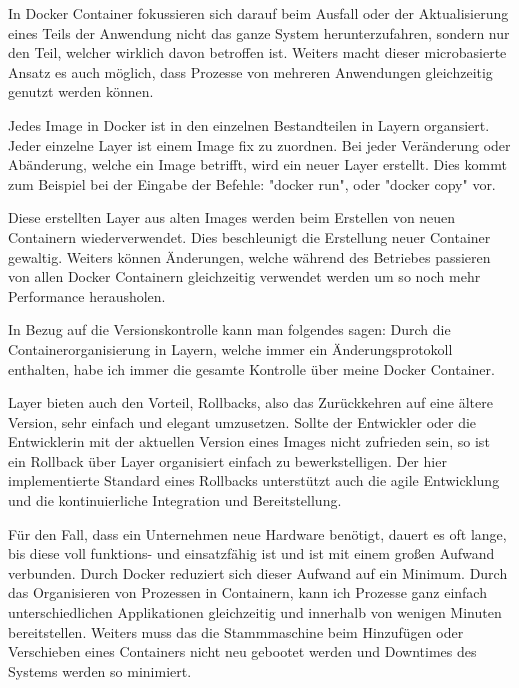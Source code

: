 

In Docker Container fokussieren sich darauf beim Ausfall oder der Aktualisierung eines Teils der Anwendung nicht das ganze System herunterzufahren, sondern nur den Teil, welcher wirklich davon betroffen ist. Weiters macht dieser microbasierte Ansatz es auch möglich, dass Prozesse von mehreren Anwendungen gleichzeitig genutzt werden können. \cite{DockerGrundlagen}


Jedes Image in Docker ist in den einzelnen Bestandteilen in Layern organsiert. Jeder einzelne Layer ist einem Image fix zu zuordnen. Bei jeder Veränderung oder Abänderung, welche ein Image betrifft, wird ein neuer Layer erstellt. Dies kommt zum Beispiel bei der Eingabe der Befehle: "docker run", oder "docker copy" vor.

Diese erstellten Layer aus alten Images werden beim Erstellen von neuen Containern wiederverwendet. Dies beschleunigt die Erstellung neuer Container gewaltig. Weiters können Änderungen, welche während des Betriebes passieren von allen Docker Containern gleichzeitig verwendet werden um so noch mehr Performance herausholen.

In Bezug auf die Versionskontrolle kann man folgendes sagen: Durch die Containerorganisierung in Layern, welche immer ein Änderungsprotokoll enthalten, habe ich immer die gesamte Kontrolle über meine Docker Container. \cite{DockerGrundlagen}


Layer bieten auch den Vorteil, Rollbacks, also das Zurückkehren auf eine ältere Version, sehr einfach und elegant umzusetzen. Sollte der Entwickler oder die Entwicklerin mit der aktuellen Version eines Images nicht zufrieden sein, so ist ein Rollback über Layer organisiert einfach zu bewerkstelligen. Der hier implementierte Standard eines Rollbacks unterstützt auch die agile Entwicklung und die kontinuierliche Integration und Bereitstellung. \cite{DockerGrundlagen}


Für den Fall, dass ein Unternehmen neue Hardware benötigt, dauert es oft lange, bis diese voll funktions- und einsatzfähig ist und ist mit einem großen Aufwand verbunden. Durch Docker reduziert sich dieser Aufwand auf ein Minimum. Durch das Organisieren von Prozessen in Containern, kann ich Prozesse ganz einfach unterschiedlichen Applikationen gleichzeitig und innerhalb von wenigen Minuten bereitstellen. Weiters muss das die Stammmaschine beim Hinzufügen oder Verschieben eines Containers nicht neu gebootet werden und Downtimes des Systems werden so minimiert. \cite{DockerGrundlagen}
